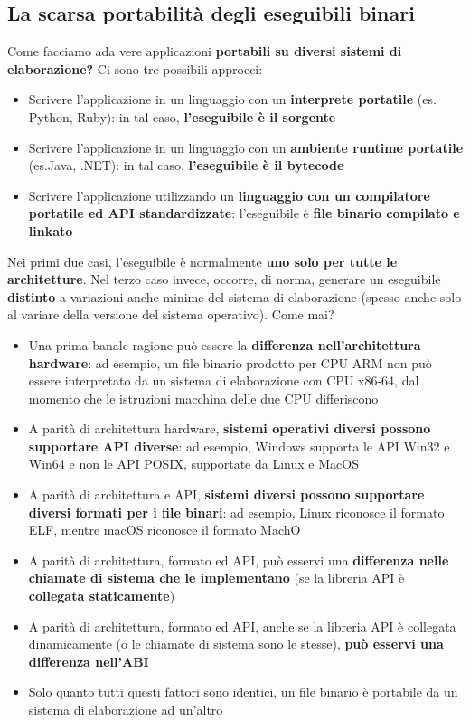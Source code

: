 \documentclass[12pt]{article}
\begin{document}
\subsection{La scarsa portabilità degli eseguibili binari}
Come facciamo ada vere applicazioni \textbf{portabili su diversi sistemi di elaborazione?}
Ci sono tre possibili approcci:
\begin{itemize}
    \item Scrivere l'applicazione in un linguaggio con un \textbf{interprete portatile} (es. Python, Ruby): in tal caso, \textbf{l'eseguibile è il sorgente}
    \item Scrivere l'applicazione in un linguaggio con un \textbf{ambiente runtime portatile} (es.Java, .NET): in tal caso, \textbf{l'eseguibile è il bytecode}
    \item Scrivere l'applicazione utilizzando un \textbf{linguaggio con un compilatore portatile ed API standardizzate}: l'eseguibile è \textbf{file binario compilato e linkato}
\end{itemize}
Nei primi due casi, l'eseguibile è normalmente \textbf{uno solo per tutte le architetture}.
Nel terzo caso invece, occorre, di norma, generare un eseguibile \textbf{distinto} a variazioni anche minime del sistema di elaborazione (spesso anche solo al variare della versione del sistema operativo).
Come mai?
\begin{itemize}
    \item Una prima banale ragione può essere la \textbf{differenza nell'architettura hardware}: ad esempio, un file binario prodotto per CPU ARM non può essere interpretato da un sistema di elaborazione con CPU x86-64, dal momento che le istruzioni macchina delle due CPU differiscono
    \item A parità di architettura hardware, \textbf{sistemi operativi diversi possono supportare API diverse}: ad esempio, Windows supporta le API Win32 e Win64 e non le API POSIX, supportate da Linux e MacOS
    \item A parità di architettura e API, \textbf{sistemi diversi possono supportare diversi formati per i file binari}: ad esempio, Linux riconosce il formato ELF, mentre macOS riconosce il formato MachO
    \item A parità di architettura, formato ed API, può esservi una \textbf{differenza nelle chiamate di sistema che le implementano} (se la libreria API è \textbf{collegata staticamente})
    \item A parità di architettura, formato ed API, anche se la libreria API è collegata dinamicamente (o le chiamate di sistema sono le stesse), \textbf{può esservi una differenza nell'ABI}
    \item Solo quanto tutti questi fattori sono identici, un file binario è portabile da un sistema di elaborazione ad un'altro
\end{itemize} 
\end{document}
